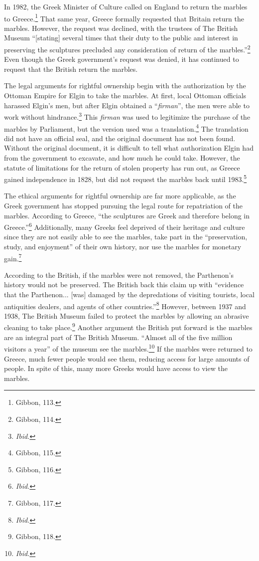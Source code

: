 \documentclass[11pt]{article}
\begin{document}
In 1982, the Greek Minister of Culture called on England to return the marbles to Greece.\footnote{Gibbon, 113.} That same year, Greece formally requested that Britain return the marbles. However, the request was declined, with the trustees of The British Museum ``[stating] several times that their duty to the public and interest in preserving the sculptures precluded any consideration of return of the marbles.''\footnote{Gibbon, 114.} Even though the Greek government's request was denied, it has continued to request that the British return the marbles.

The legal arguments for rightful ownership begin with the authorization by the Ottoman Empire for Elgin to take the marbles. At first, local Ottoman officials harassed Elgin's men, but after Elgin obtained a ``\textit{firman}'', the men were able to work without hindrance.\footnote{\textit{Ibid.}} This \textit{firman} was used to legitimize the purchase of the marbles by Parliament, but the version used was a translation.\footnote{Gibbon, 115.} The translation did not have an official seal, and the original document has not been found. Without the original document, it is difficult to tell what authorization Elgin had from the government to excavate, and how much he could take. However, the statute of limitations for the return of stolen property has run out, as Greece gained independence in 1828, but did not request the marbles back until 1983.\footnote{Gibbon, 116.}

The ethical arguments for rightful ownership are far more applicable, as the Greek government has stopped pursuing the legal route for repatriation of the marbles. According to Greece, ``the sculptures are Greek and therefore belong in Greece.''\footnote{\textit{Ibid.}} Additionally, many Greeks feel deprived of their heritage and culture since they are not easily able to see the marbles, take part in the ``preservation, study, and enjoyment'' of their own history, nor use the marbles for monetary gain.\footnote{Gibbon, 117.} 

According to the British, if the marbles were not removed, the Parthenon's history would not be preserved. The British back this claim up with ``evidence that the Parthenon... [was] damaged by the depredations of visiting tourists, local antiquities dealers, and agents of other countries.''\footnote{\textit{Ibid.}} However, between 1937 and 1938, The British Museum failed to protect the marbles by allowing an abrasive cleaning to take place.\footnote{Gibbon, 118.} Another argument the British put forward is the marbles are an integral part of The British Museum. ``Almost all of the five million visitors a year'' of the museum see the marbles.\footnote{\textit{Ibid.}} If the marbles were returned to Greece, much fewer people would see them, reducing access for large amounts of people. In spite of this, many more Greeks would have access to view the marbles.
\end{document}
